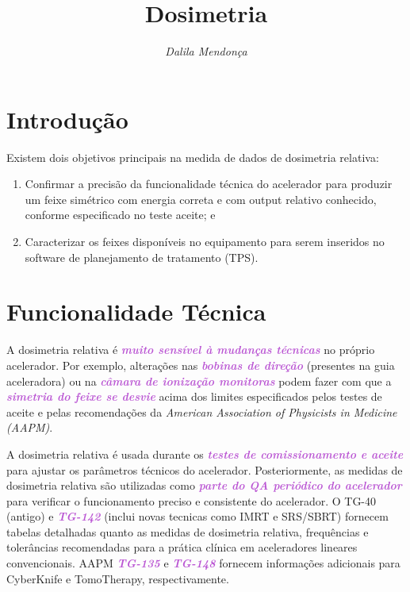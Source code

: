 \documentclass[11pt,a4paper]{article}
\title{\LobsterTwo\Huge{Dosimetria}}
\author{\LobsterTwo{Dosimetria Relativa}\nocite{*}}
\date{\LobsterTwo\textit{Dalila Mendonça}}
\newcounter{exemplo}
\begin{document}
	\maketitle


\section{Introdução}

	Existem dois objetivos principais na medida de dados de dosimetria relativa:
	
	\begin{enumerate}[label=\textcolor{CarnationPink}{(\roman*)}]
		\item Confirmar a precisão da funcionalidade técnica do acelerador para produzir um feixe simétrico com energia correta e com output relativo conhecido, conforme especificado no teste aceite; e
		\item Caracterizar os feixes disponíveis no equipamento para serem inseridos no software de planejamento de tratamento (TPS).
	\end{enumerate}
	
\section{Funcionalidade Técnica}

	A dosimetria relativa é \textcolor{MediumOrchid}{\textbf{\textit{muito sensível à mudanças técnicas}}} no próprio acelerador. Por exemplo, alterações nas \textcolor{MediumOrchid}{\textbf{\textit{bobinas de direção}}} (presentes na guia aceleradora) ou na \textcolor{MediumOrchid}{\textbf{\textit{câmara de ionização monitoras}}} podem fazer com que a \textcolor{MediumOrchid}{\textbf{\textit{simetria do feixe se desvie}}} acima dos limites especificados pelos testes de aceite e pelas recomendações da \textit{American Association of Physicists in Medicine (AAPM)}.

	A dosimetria relativa é usada durante os \textcolor{MediumOrchid}{\textbf{\textit{testes de comissionamento e aceite}}} para ajustar os parâmetros técnicos do acelerador. Posteriormente, as medidas de dosimetria relativa são utilizadas como \textcolor{MediumOrchid}{\textbf{\textit{parte do QA periódico do acelerador}}} para verificar o funcionamento preciso e consistente do acelerador. O TG-40 (antigo) e \textcolor{MediumOrchid}{\textbf{\textit{TG-142}}} (inclui novas tecnicas como IMRT e SRS/SBRT) fornecem tabelas detalhadas quanto as medidas de dosimetria relativa, frequências e tolerâncias recomendadas para a prática clínica em aceleradores lineares convencionais. AAPM \textcolor{MediumOrchid}{\textbf{\textit{TG-135}}} e \textcolor{MediumOrchid}{\textbf{\textit{TG-148}}} fornecem informações adicionais para CyberKnife e TomoTherapy, respectivamente.
\end{document}
